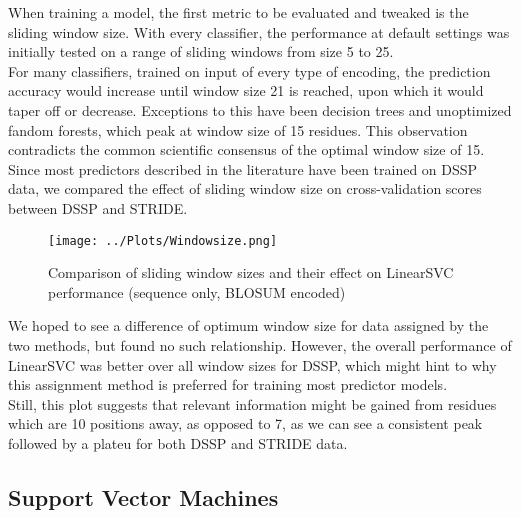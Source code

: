 \documentclass[12pt]{article}
\begin{document}
When training a model, the first metric to be evaluated and tweaked is the sliding window size. With every classifier, the performance at default settings was initially tested on a range of sliding windows from size 5 to 25.\\
For many classifiers, trained on input of every type of encoding, the prediction accuracy would increase until window size 21 is reached, upon which it would taper off or decrease.
Exceptions to this have been decision trees and unoptimized  fandom forests, which peak at window size of 15 residues. This observation contradicts the common scientific consensus of the optimal window size of 15.\\
\newpage
\noindent Since most predictors described in the literature have been trained on DSSP data, we compared the effect of sliding window size on cross-validation scores between DSSP and STRIDE.
\begin{figure}[H]
\hspace*{-0.3in}
\texttt{[image: ../Plots/Windowsize.png]}
\caption{Comparison of sliding window sizes and their effect on LinearSVC performance (sequence only, BLOSUM encoded)}
\end{figure}

\noindent We hoped to see a difference of optimum window size for data assigned by the two methods, but found no such relationship. However, the overall performance of LinearSVC was better over all window sizes for DSSP, which might hint to why this assignment method is preferred for training most predictor models. \\
Still, this plot suggests that relevant information might be gained from residues which are 10 positions away, as opposed to 7, as we can see a consistent peak followed by a plateu for both DSSP and STRIDE data.  


\subsection{Support Vector Machines}
\end{document}
